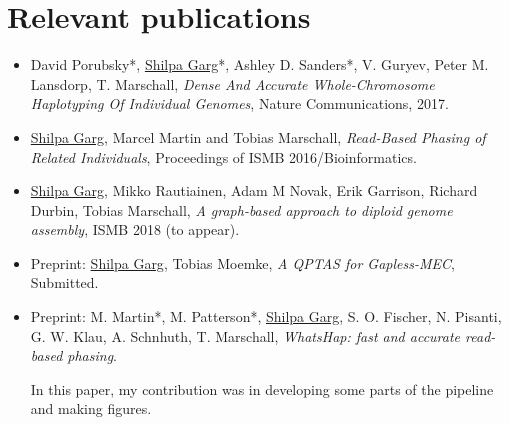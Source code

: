 \section{Relevant publications}
\begin{itemize}
 \item David Porubsky*, \underline{Shilpa Garg}*, Ashley D. Sanders*, V. Guryev, Peter M. Lansdorp, T. Marschall,
\textit{Dense And Accurate Whole-Chromosome Haplotyping Of Individual Genomes}, Nature Communications, 2017.


\item \underline{Shilpa Garg}, Marcel Martin and Tobias Marschall, \textit{Read-Based Phasing of Related Individuals},
Proceedings of ISMB 2016/Bioinformatics.
\item \underline{Shilpa Garg}, Mikko Rautiainen, Adam M Novak, Erik Garrison, Richard Durbin, Tobias Marschall, \textit{A graph-based approach to diploid genome assembly}, ISMB 2018 (to appear).
\item Preprint: \underline{Shilpa Garg}, Tobias Moemke, \textit{A QPTAS for Gapless-MEC}, Submitted.
\item Preprint: M. Martin*, M. Patterson*, \underline{Shilpa Garg}, S. O. Fischer, N. Pisanti, G. W. Klau, A. Schnhuth, T.
Marschall, \textit{WhatsHap: fast and accurate read-based phasing}.

In this paper, my contribution was in developing some parts of the pipeline and making figures.
\end{itemize}




